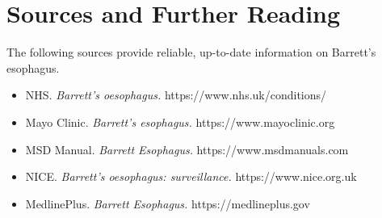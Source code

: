 \section*{Sources and Further Reading}
The following sources provide reliable, up-to-date information on Barrett's esophagus.
\begin{itemize}
    \item NHS. \textit{Barrett's oesophagus.} https://www.nhs.uk/conditions/
    \item Mayo Clinic. \textit{Barrett's esophagus.} https://www.mayoclinic.org
    \item MSD Manual. \textit{Barrett Esophagus.} https://www.msdmanuals.com
    \item NICE. \textit{Barrett's oesophagus: surveillance.} https://www.nice.org.uk
    \item MedlinePlus. \textit{Barrett Esophagus.} https://medlineplus.gov
\end{itemize}
